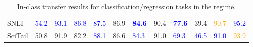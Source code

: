 \begin{landscape}
\begin{table}[t]
\begin{adjustbox}{max width=2\textwidth}
\begin{tabular}{ l  l l l l  l l l l  l l l }
SNLI & \textcolor{blue}{54.2} & \textcolor{blue}{93.1} & \textcolor{blue}{86.8} & \textcolor{blue}{87.5} & 86.9 & \textbf{\textcolor{blue}{84.6}} & 90.4 & \textbf{\textcolor{blue}{77.6}} & 39.4 & \textcolor{orange}{90.7} & \textcolor{blue}{95.2}\\
SciTail & 50.8 & 91.9 & 82.2 & \textcolor{blue}{88.1} & 86.6 & \textcolor{blue}{84.3} & 91.0 & \textcolor{blue}{69.3} & \textcolor{blue}{46.5} & \textcolor{blue}{91.0} & \textcolor{orange}{93.9}\\
\bottomrule
\end{tabular}
\end{adjustbox}
\caption{In-class transfer results for classification/regression tasks in the  regime.}
\label{tbla4a}
\end{table}
\end{landscape}